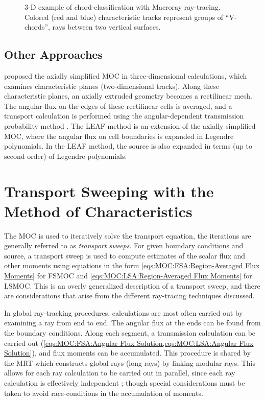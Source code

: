{{{            \begin{figure}[h]
                \centering
                \def\svgwidth{0.45\linewidth}
                
                \caption{3-D example of chord-classification with Macroray ray-tracing. Colored (red and blue) characteristic tracks represent groups of ``V-chords'', rays between two vertical surfaces.}
                \label{fig:RT:Chord-Classification Macroray}
            \end{figure}
        }
        \subsection{Other Approaches}{\label{ssec:RT:Other Approaches}
            \citet{Giho2008} proposed the axially simplified \ac{MOC} in three-dimensional calculations, which examines characteristic planes (two-dimensional tracks).
            Along these characteristic planes, an axially extruded geometry becomes a rectilinear mesh.
            The angular flux on the edges of these rectilinear cells is averaged, and a transport calculation is performed using the angular-dependent transmission probability method \cite{Yamamoto2015}.
            The \ac{LEAF} method \cite{Yamamoto2017} is an extension of the axially simplified \ac{MOC}, where the angular flux on cell boundaries is expanded in Legendre polynomials.
            In the \ac{LEAF} method, the source is also expanded in terms (up to second order) of Legendre polynomials.
        }
    }
    \section{Transport Sweeping with the Method of Characteristics}{\label{sec:RT:Transport Sweeping with the Method of Characteristics}
        The \ac{MOC} is used to iteratively solve the transport equation, the iterations are generally referred to as \emph{transport sweeps}.
        For given boundary conditions and source, a transport sweep is used to compute estimates of the scalar flux and other moments using equations in the form \cref{eqs:MOC:FSA:Region-Averaged Flux Moments} for \ac{FSMOC} and \cref{eqs:MOC:LSA:Region-Averaged Flux Moments} for \ac{LSMOC}.
        This is an overly generalized description of a transport sweep, and there are considerations that arise from the different ray-tracing techniques discussed.

        In global ray-tracking procedures, calculations are most often carried out by examining a ray from end to end.
        The angular flux at the ends can be found from the boundary conditions.
        Along each segment, a transmission calculation can be carried out (\cref{eqs:MOC:FSA:Angular Flux Solution,eqs:MOC:LSA:Angular Flux Solution}), and flux moments can be accumulated.
        This procedure is shared by the \ac{MRT} which constructs global rays (long rays) by linking modular rays.
        This allows for each ray calculation to be carried out in parallel, since each ray calculation is effectively independent \cite{Kochunas2013}; though special considerations must be taken to avoid race-conditions in the accumulation of moments.

}}
